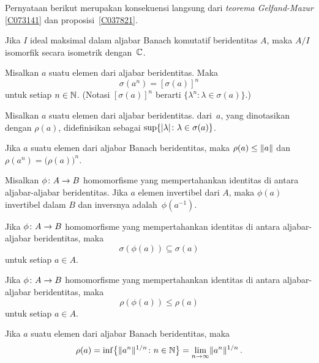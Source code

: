 Pernyataan berikut merupakan konsekuensi langsung dari \emph{teorema Gelfand-Mazur}
\ref{C073141} dan proposisi~\ref{C037821}.

\begin{cor}\label{C073147} Jika $I$ ideal maksimal dalam aljabar Banach komutatif beridentitas $A$,
maka $A/I$ isomorfik secara isometrik dengan~$\mathbb{C}$.
\end{cor}

\begin{prop}\label{0006703fa} Misalkan $a$ suatu elemen dari aljabar beridentitas. Maka
   \[ \sigma(a^n) = [\sigma(a)]^n \]
untuk setiap $n \in \mathbb{N}$. (Notasi $[\sigma(a)]^n$ berarti $\{\lambda^n\colon \lambda \in
\sigma(a)\}$.)
\end{prop}

\begin{defn}\label{C073154} Misalkan $a$ suatu elemen dari aljabar beridentitas.
 dari~$a$, yang dinotasikan dengan $\rho(a)$, didefinisikan sebagai
$\sup\{\lvert\lambda\rvert\colon \lambda \in \sigma(a)\}$.
\end{defn}

\begin{prop}\label{0006703} Jika $a$ suatu elemen dari aljabar Banach beridentitas, maka $\rho(a) \le
\lVert a\rVert$ dan $\rho(a^n) = \bigl(\rho(a)\bigr)^n$.
\end{prop}

\begin{prop} Misalkan $\phi\colon A \rightarrow B$ homomorfisme yang mempertahankan identitas di antara aljabar-aljabar beridentitas. Jika $a$ elemen invertibel dari $A$,
maka $\phi(a)$ invertibel dalam $B$ dan inversnya adalah~$\phi(a^{-1})$.
\end{prop}

\begin{cor} Jika $\phi\colon A \rightarrow B$ homomorfisme yang mempertahankan identitas di antara aljabar-aljabar beridentitas, maka
   \[ \sigma(\phi(a)) \subseteq \sigma(a) \]
untuk setiap $a \in A$.
\end{cor}

\begin{cor} Jika $\phi\colon A \rightarrow B$ homomorfisme yang mempertahankan identitas di antara aljabar-aljabar beridentitas, maka
   \[ \rho(\phi(a)) \le \rho(a) \]
untuk setiap $a \in A$.
\end{cor}

\begin{thm}\label{C073157} Jika $a$ suatu elemen dari aljabar Banach
beridentitas, maka
   \[ \rho(a) = \inf\bigl\{\lVert a^n\rVert^{1/n}\colon n \in \mathbb{N}\bigr\}
                                = \lim_{n \rightarrow \infty} \lVert a^n\rVert^{1/n}\,. \]
\end{thm}

